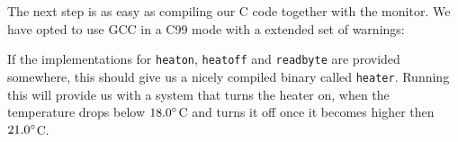 The next step is as easy as compiling our C code together with the monitor. We
have opted to use GCC in a C99 mode with a extended set of warnings:

If the implementations for \texttt{heaton}, \texttt{heatoff} and
\texttt{readbyte} are provided somewhere, this should give us a nicely compiled
binary called \texttt{heater}. Running this will provide us with a system that
turns the heater on, when the temperature drops below $18.0\degree$C and turns
it off once it becomes higher then $21.0\degree$C.
